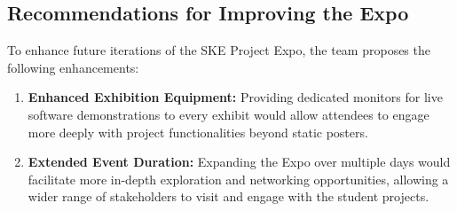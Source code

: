 \subsection{Recommendations for Improving the Expo}
\label{section:project-expo-recommendations-for-improving-the-expo}
To enhance future iterations of the SKE Project Expo, the team proposes the following enhancements:
\begin{enumerate}
    \item \textbf{Enhanced Exhibition Equipment:} Providing dedicated monitors for live software demonstrations to every exhibit would allow attendees to engage more deeply with project functionalities beyond static posters.
    \item \textbf{Extended Event Duration:} Expanding the Expo over multiple days would facilitate more in-depth exploration and networking opportunities, allowing a wider range of stakeholders to visit and engage with the student projects.
\end{enumerate}

